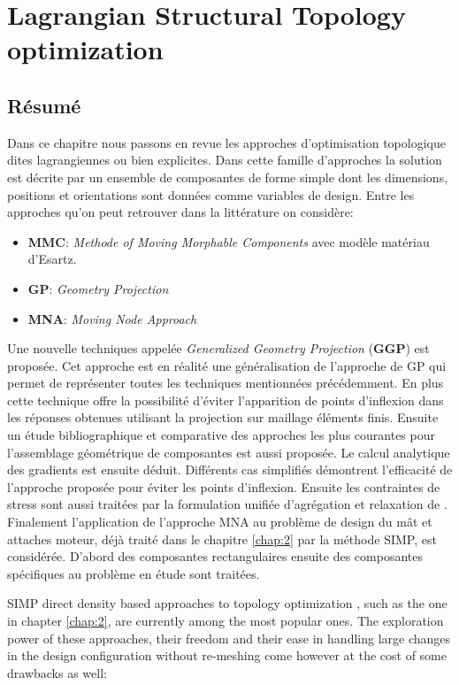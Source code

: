 \chapter{Lagrangian Structural Topology optimization}
\minitoc
\begin{mdframed}[hidealllines=true,backgroundcolor=lightgray!20]
\section*{Résumé}
Dans ce chapitre nous passons en revue les approches d'optimisation topologique dites lagrangiennes ou bien explicites. Dans cette famille d'approches la solution est décrite par un ensemble de composantes de forme simple dont les dimensions, positions et orientations sont données comme variables de design. Entre les approches qu'on peut retrouver dans la littérature on considère:
 \begin{itemize}
 \item \textbf{MMC}: \textit{Methode of Moving Morphable Components} avec modèle matériau d'Esartz.
 \item \textbf{GP}: \textit{Geometry Projection}
 \item \textbf{MNA}: \textit{Moving Node Approach}
 \end{itemize}
 Une nouvelle techniques appelée \textit{Generalized Geometry Projection} (\textbf{GGP}) est proposée. Cet approche est en réalité une généralisation de l'approche de GP qui permet de représenter toutes les techniques mentionnées précédemment. En plus cette technique offre la possibilité d'éviter l'apparition de points d'inflexion dans les réponses obtenues utilisant la projection sur maillage éléments finis. Ensuite un étude bibliographique et comparative des approches les plus courantes pour l'assemblage géométrique de composantes est aussi proposée. Le calcul analytique des gradients est ensuite déduit.
 Différents cas simplifiés démontrent l'efficacité de l'approche proposée pour éviter les points d'inflexion. 
 Ensuite les contraintes de stress sont aussi traitées par la formulation unifiée d'agrégation et relaxation de \cite{verbart2017unified}. Finalement l'application  de l'approche MNA au problème de design du mât et attaches moteur, déjà traité dans le chapitre \ref{chap:2} par la méthode SIMP, est considérée. D'abord des composantes rectangulaires ensuite des composantes  spécifiques au problème en étude sont traitées. 
\end{mdframed}
\label{chap:3}
    SIMP direct density based approaches to topology optimization \cite{bendsoe1989optimal,zhou1991coc,bendsoe1995optimization}, such as the one in chapter \ref{chap:2}, are currently among the most popular ones. The exploration power of these approaches, their freedom and their ease in handling large changes in the design configuration without re-meshing come however at the cost of some drawbacks as well:
